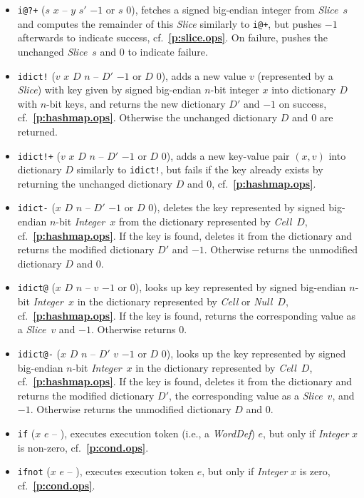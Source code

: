 \documentclass[12pt,oneside]{article}
\def\refpoint#1{{\rm\textbf{\ref{#1}}}}
\let\ptref=\refpoint
\begin{document}
\begin{itemize}
\item {\tt i@?+} ($s$ $x$ -- $y$ $s'$ $-1$ or $s$ $0$), fetches a signed big-endian integer from {\em Slice\/}~$s$ and computes the remainder of this {\em Slice\/} similarly to {\tt i@+}, but pushes $-1$ afterwards to indicate success, cf.~\ptref{p:slice.ops}. On failure, pushes the unchanged {\em Slice\/}~$s$ and $0$ to indicate failure.
\item {\tt idict!} ($v$ $x$ $D$ $n$ -- $D'$ $-1$ or $D$ $0$), adds a new value $v$ (represented by a {\em Slice\/}) with key given by signed big-endian $n$-bit integer $x$ into dictionary $D$ with $n$-bit keys, and returns the new dictionary $D'$ and $-1$ on success, cf.~\ptref{p:hashmap.ops}. Otherwise the unchanged dictionary $D$ and $0$ are returned.
\item {\tt idict!+} ($v$ $x$ $D$ $n$ -- $D'$ $-1$ or $D$ $0$), adds a new key-value pair $(x,v)$ into dictionary $D$ similarly to {\tt idict!}, but fails if the key already exists by returning the unchanged dictionary $D$ and $0$, cf.~\ptref{p:hashmap.ops}.
\item {\tt idict-} ($x$ $D$ $n$ -- $D'$ $-1$ or $D$ $0$), deletes the key represented by signed big-endian $n$-bit {\em Integer\/}~$x$ from the dictionary represented by {\em Cell\/}~$D$, cf.~\ptref{p:hashmap.ops}. If the key is found, deletes it from the dictionary and returns the modified dictionary $D'$ and $-1$. Otherwise returns the unmodified dictionary $D$ and $0$.
\item {\tt idict@} ($x$ $D$ $n$ -- $v$ $-1$ or $0$), looks up key represented by signed big-endian $n$-bit {\em Integer\/}~$x$ in the dictionary represented by {\em Cell\/} or {\em Null\/}~$D$, cf.~\ptref{p:hashmap.ops}. If the key is found, returns the corresponding value as a {\em Slice\/}~$v$ and $-1$. Otherwise returns $0$.
\item {\tt idict@-} ($x$ $D$ $n$ -- $D'$ $v$ $-1$ or $D$ $0$), looks up the key represented by signed big-endian $n$-bit {\em Integer\/}~$x$ in the dictionary represented by {\em Cell\/}~$D$, cf.~\ptref{p:hashmap.ops}. If the key is found, deletes it from the dictionary and returns the modified dictionary $D'$, the corresponding value as a {\em Slice\/}~$v$, and $-1$. Otherwise returns the unmodified dictionary $D$ and $0$.
\item {\tt if} ($x$ $e$ -- ), executes execution token (i.e., a {\em WordDef\/}) $e$, but only if {\em Integer\/} $x$ is non-zero, cf.~\ptref{p:cond.ops}.
\item {\tt ifnot} ($x$ $e$ -- ), executes execution token $e$, but only if {\em Integer\/} $x$ is zero, cf.~\ptref{p:cond.ops}.

\end{itemize}
\end{document}
